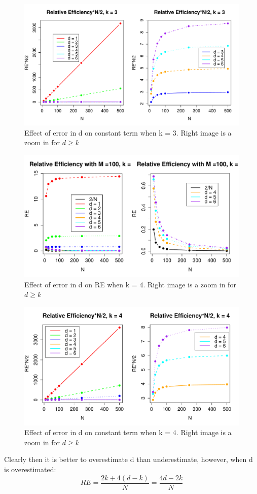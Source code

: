 \documentclass[10pt]{article}
\begin{document}
\begin{figure}[!htb]
	\centering
	\includegraphics[width=18cm]{RPlot01.pdf}
	\caption{  Effect of error in d on constant term when k = 3. Right image is a zoom in for $d \ge k$}
	\label{fig:plot1}
\end{figure}
\newpage
\begin{figure}[!htb]
	\centering
	\includegraphics[width=18cm]{RPlot05.pdf}
	\caption{  Effect of error in d on RE when k = 4. Right image is a zoom in for $d \ge k$}
	\label{fig:plot1}
\end{figure}

\begin{figure}[!htb]
	\centering
	\includegraphics[width=18cm]{RPlot04.pdf}
	\caption{  Effect of error in d on constant term when k = 4. Right image is a zoom in for $d \ge k$}
	\label{fig:plot1}
\end{figure}
\newpage
Clearly then it is better to overestimate d than underestimate, however, when d is overestimated:
\[
RE = \dfrac{2k+4(d-k)}{N} = \dfrac{4d-2k}{N}
\]
\end{document}
